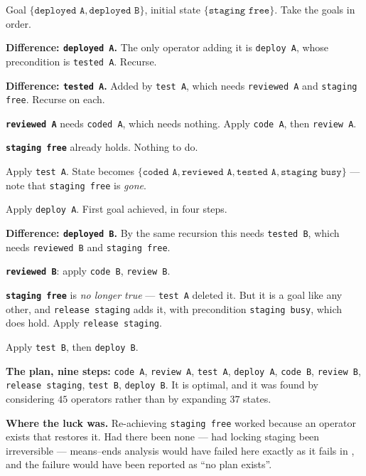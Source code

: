 \begin{worked}
Goal $\{\texttt{deployed A}, \texttt{deployed B}\}$, initial state
$\{\texttt{staging free}\}$. Take the goals in order.

\smallskip
\textbf{Difference: \texttt{deployed A}.} The only operator adding it is
\texttt{deploy A}, whose precondition is \texttt{tested A}. Recurse.

\smallskip
\quad\textbf{Difference: \texttt{tested A}.} Added by \texttt{test A}, which needs
\texttt{reviewed A} and \texttt{staging free}. Recurse on each.

\smallskip
\quad\quad\textbf{\texttt{reviewed A}} needs \texttt{coded A}, which needs nothing.
Apply \texttt{code A}, then \texttt{review A}.

\smallskip
\quad\quad\textbf{\texttt{staging free}} already holds. Nothing to do.

\smallskip
\quad Apply \texttt{test A}. State becomes
$\{\texttt{coded A}, \texttt{reviewed A}, \texttt{tested A},
\texttt{staging busy}\}$ --- note that \texttt{staging free} is \emph{gone}.

\smallskip
Apply \texttt{deploy A}. First goal achieved, in four steps.

\smallskip
\textbf{Difference: \texttt{deployed B}.} By the same recursion this needs
\texttt{tested B}, which needs \texttt{reviewed B} and \texttt{staging free}.

\smallskip
\quad\textbf{\texttt{reviewed B}}: apply \texttt{code B}, \texttt{review B}.

\smallskip
\quad\textbf{\texttt{staging free}} is \emph{no longer true} --- \texttt{test A}
deleted it. But it is a goal like any other, and \texttt{release staging} adds it,
with precondition \texttt{staging busy}, which does hold. Apply
\texttt{release staging}.

\smallskip
\quad Apply \texttt{test B}, then \texttt{deploy B}.

\smallskip
\textbf{The plan, nine steps:}
\texttt{code A}, \texttt{review A}, \texttt{test A}, \texttt{deploy A},
\texttt{code B}, \texttt{review B}, \texttt{release staging}, \texttt{test B},
\texttt{deploy B}. It is optimal, and it was found by considering $45$ operators
rather than by expanding $37$ states.

\smallskip
\textbf{Where the luck was.} Re-achieving \texttt{staging free} worked because an
operator exists that restores it. Had there been none --- had locking staging been
irreversible --- means--ends analysis would have failed here exactly as it fails in
, and the failure would have been reported as ``no plan exists''.
\end{worked}

